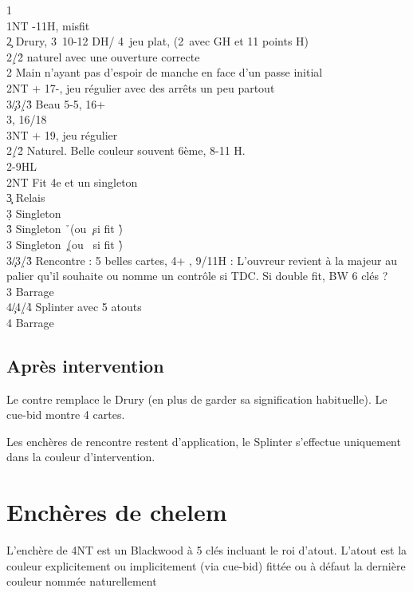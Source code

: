 \documentclass[a4paper]{article}
\begin{document}
\begin{bidtable}
1\s\+\\
1NT -11H, misfit\\
2\c \> Drury, 3\s\ 10-12 DH/ 4\s\ jeu plat, (2\s\ avec GH et 11 points H)\+\\
2\d/2\h \> naturel avec une ouverture correcte\\
2\s \> Main n'ayant pas d'espoir de manche en face d'un passe initial\\
2NT + 17-, jeu régulier avec des arrêts un peu partout\\
3\c/3\d/3\h \> Beau 5-5, 16+\\
3\s {}\s , 16/18\\
3NT + 19, jeu régulier\-\\
2\d/2\h \> Naturel. Belle couleur souvent 6ème, 8-11 H.\\
2\s {}-9HL\\
2NT \> Fit 4e et un singleton\+\\
3\c \> Relais\+\\
3\d \> Singleton \d \\
3\h \> Singleton \h\ (ou \c\ si fit \h )\\
3\s \> Singleton \c\ (ou \s\ si fit \h )\-\-\\
3\c/3\d/3\h \> Rencontre : 5 belles cartes, 4+ \s , 9/11H : L'ouvreur revient à la majeur au palier qu'il souhaite ou nomme un contrôle si TDC. Si double fit, BW 6 clés ?\\
3\s \> Barrage\\
4\c/4\d/4\h \> Splinter avec 5 atouts\\
4\s \> Barrage\-
\end{bidtable}

\subsection{Après intervention}

Le contre remplace le Drury (en plus de garder sa signification habituelle). Le cue-bid montre 4 cartes.

Les enchères de rencontre restent d'application, le Splinter s'effectue uniquement dans la couleur d'intervention.

\section{Enchères de chelem}

L'enchère de 4NT est un Blackwood à 5 clés incluant le roi d'atout. L'atout est la couleur explicitement ou implicitement (via cue-bid) fittée ou à défaut la dernière couleur nommée naturellement
\end{document}
